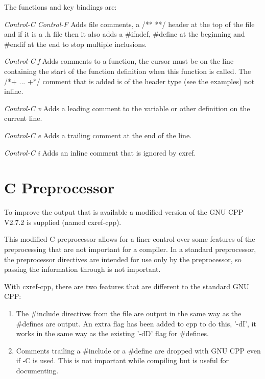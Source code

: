 The functions and key bindings are:
\begin{list}{}{\leftmargin=1.3in }
\item[{\it Control-C Control-F}]
Adds file comments, a /** **/ header at the top of the
file and if it is a .h file then it also adds a \#ifndef,
\#define at the beginning and \#endif at the end to stop
multiple inclusions.
\item[{\it Control-C f}]
Adds comments to a function, the cursor must be on the
line containing the start of the function definition when
this function is called.  The /*+ ... +*/ comment that is
added is of the header type (see the examples) not inline.
\item[{\it Control-C v}]
Adds a leading comment to the variable or other definition
on the current line.
\item[{\it Control-C e}]
Adds a trailing comment at the end of the line.
\item[{\it Control-C i}]
Adds an inline comment that is ignored by cxref.
\end{list}

\section{C Preprocessor}

To improve the output that is available a modified version of the GNU CPP V2.7.2
is supplied (named cxref-cpp).

This modified C preprocessor allows for a finer control over some features of
the preprocessing that are not important for a compiler.  In a standard
preprocessor, the preprocessor directives are intended for use only by the
preprocessor, so passing the information through is not important.

With cxref-cpp, there are two features that are different to the standard GNU
CPP:

\begin{enumerate}
\item
The \#include directives from the file are output in the same way as the
\#defines are output.  An extra flag has been added to cpp to do this, '-dI',
it works in the same way as the existing '-dD' flag for \#defines.
\item
Comments trailing a \#include or a \#define are dropped with GNU CPP even if -C
is used. This is not important while compiling but is useful for documenting.
\end{enumerate}

